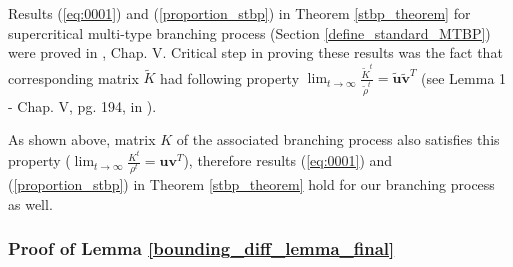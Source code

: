 \documentclass{article}
\newtheorem{lemma}{Lemma}[section]
\theoremstyle{definition}
\begin{document}
 
 




Results (\ref{eq:0001}) and (\ref{proportion_stbp}) in Theorem \ref{stbp_theorem} for supercritical multi-type branching process (Section \ref{define_standard_MTBP})
were proved in \cite{branching_process_notes}, Chap. V. Critical step in proving these results was the fact that corresponding matrix $\tilde{K}$ had following property $ \lim_{t \to \infty} \frac{\tilde{K}^t}{\tilde{\rho}^t} = \bm{\tilde{u}}\bm{\tilde{v}}^T$ (see Lemma 1 - Chap. V, pg. 194,  in \cite{branching_process_notes}).

As shown above, matrix $K$ of the associated branching process also satisfies this property ($ \lim_{t \to \infty} \frac{K^t}{\rho^t} = \bm{u}\bm{v}^T $), therefore results (\ref{eq:0001}) and (\ref{proportion_stbp}) in Theorem \ref{stbp_theorem} hold for our branching process as well.


\subsubsection{Proof of Lemma \ref{bounding_diff_lemma_final}}


\end{document}
